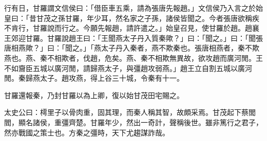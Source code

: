 \begin{pinyinscope}
行有日，甘羅謂文信侯曰：「借臣車五乘，請為張唐先報趙。」文信侯乃入言之於始皇曰：「昔甘茂之孫甘羅，年少耳，然名家之子孫，諸侯皆聞之。今者張唐欲稱疾不肯行，甘羅說而行之。今願先報趙，請許遣之。」始皇召見，使甘羅於趙。趙襄王郊迎甘羅。甘羅說趙王曰：「王聞燕太子丹入質秦歟？」曰：「聞之。」曰：「聞張唐相燕歟？」曰：「聞之。」「燕太子丹入秦者，燕不欺秦也。張唐相燕者，秦不欺燕也。燕、秦不相欺者，伐趙，危矣。燕、秦不相欺無異故，欲攻趙而廣河閒。王不如齎臣五城以廣河閒，請歸燕太子，與彊趙攻弱燕。」趙王立自割五城以廣河閒。秦歸燕太子。趙攻燕，得上谷三十城，令秦有十一。

甘羅還報秦，乃封甘羅以為上卿，復以始甘茂田宅賜之。

太史公曰：樗里子以骨肉重，固其理，而秦人稱其智，故頗采焉。甘茂起下蔡閭閻，顯名諸侯，重彊齊楚。甘羅年少，然出一奇計，聲稱後世。雖非篤行之君子，然亦戰國之策士也。方秦之彊時，天下尤趨謀詐哉。


\end{pinyinscope}